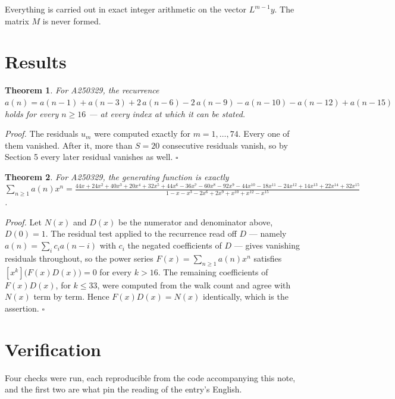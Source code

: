\documentclass[11pt]{article}
\newtheorem{theorem}{Theorem}
\theoremstyle{definition}
\begin{document}
Everything is carried out in exact integer arithmetic on the vector $L^{m-1}y$. The matrix $M$ is never formed.

\section{Results}

\begin{theorem} For A250329, the recurrence $a(n) = a(n-1) + a(n-3) + 2\,a(n-6) - 2\,a(n-9) - a(n-10) - a(n-12) + a(n-15)$ holds for every $n \ge 16$ --- at every index at which it can be stated.\end{theorem}

{\itshape Proof.} The residuals $u_m$ were computed exactly for $m = 1,\dots,74$. Every one of them vanished. After it, more than $S = 20$ consecutive residuals vanish, so by Section 5 every later residual vanishes as well. $\square$

\begin{theorem} For A250329, the generating function is exactly $\sum_{n\ge 1} a(n)x^n = \frac{44x + 24x^{2} + 40x^{3} + 20x^{4} + 32x^{5} + 44x^{6} - 36x^{7} - 60x^{8} - 92x^{9} - 44x^{10} - 18x^{11} - 24x^{12} + 14x^{13} + 22x^{14} + 32x^{15}}{1 - x - x^{3} - 2x^{6} + 2x^{9} + x^{10} + x^{12} - x^{15}}$.\end{theorem}

{\itshape Proof.} Let $N(x)$ and $D(x)$ be the numerator and denominator above, $D(0)=1$. The residual test applied to the recurrence read off $D$ --- namely $a(n) = \sum_i c_i a(n-i)$ with $c_i$ the negated coefficients of $D$ --- gives vanishing residuals throughout, so the power series $F(x)=\sum_{n\ge 1}a(n)x^n$ satisfies $[x^k]\bigl(F(x)D(x)\bigr) = 0$ for every $k > 16$. The remaining coefficients of $F(x)D(x)$, for $k \le 33$, were computed from the walk count and agree with $N(x)$ term by term. Hence $F(x)D(x) = N(x)$ identically, which is the assertion. $\square$

\section{Verification}

Four checks were run, each reproducible from the code accompanying this note, and the first two are what pin the reading of the entry's English.
\end{document}
